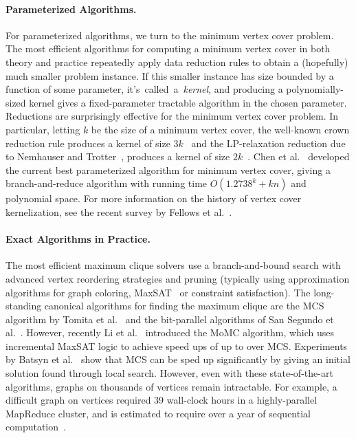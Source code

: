 \documentclass[twoside,leqno,twocolumn]{article}
\begin{document}
\paragraph*{Parameterized Algorithms.}
For parameterized algorithms, we turn to the minimum vertex cover problem. The most efficient algorithms for computing a minimum vertex cover in both theory and practice repeatedly apply data reduction rules to obtain a (hopefully) much smaller problem instance. If this smaller instance has size bounded by a function of some parameter, it's~called~a~\emph{kernel}, and producing a polynomially-sized kernel gives a fixed-parameter tractable algorithm in the chosen parameter. Reductions are surprisingly effective for the minimum vertex cover problem. In particular, letting $k$ be the size of a minimum vertex cover, the well-known crown reduction rule produces a kernel of size $3k$~\cite{chor2005linear} and the LP-relaxation reduction due to Nemhauser and Trotter~\cite{nemhauser-1975}, produces a kernel of size $2k$~\cite{chen1999}. Chen et al.~\cite{chen2010improved} developed the current best parameterized algorithm for minimum vertex cover, giving a branch-and-reduce algorithm with running time $O(1.2738^k +kn)$ and polynomial space.
For more information on the history of vertex cover kernelization, see the recent survey by Fellows et al.~\cite{fellows2018known}.

\paragraph*{Exact Algorithms in Practice.}
The most efficient maximum clique solvers use a branch-and-bound search with
advanced vertex reordering strategies and pruning (typically using approximation
algorithms for graph coloring, MaxSAT~\cite{li-maxsat-2013} or constraint
satisfaction). The long-standing canonical algorithms for finding the maximum
clique are the MCS algorithm by Tomita et al.~\cite{tomita-recoloring} and the
bit-parallel algorithms of San Segundo et
al.~\cite{segundo-recoloring,segundo-bitboard-2011}. However, recently Li et
al.~\cite{DBLP:journals/cor/LiJM17} introduced the MoMC algorithm, which uses
incremental MaxSAT logic to achieve speed ups of up to  over MCS.
Experiments by Batsyn et al.~\cite{batsyn-mcs-ils-2014} show that MCS can be
sped up significantly by giving an initial solution found through local search.
However, even with these state-of-the-art algorithms, graphs on thousands of
vertices remain intractable. For example, a difficult graph on  vertices required 39 wall-clock hours in a highly-parallel MapReduce cluster, and is estimated to require over a year of sequential computation~\cite{xiang-2013}. 
\end{document}
